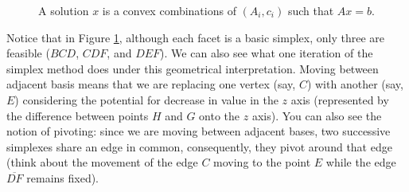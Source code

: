 \begin{figure}[h]
	\caption{A solution $x$ is a convex combinations of $(A_i,c_i)$ such that $Ax= b$.} \label{p1c4:fig:column_geometry_3d}
\end{figure}	

Notice that in Figure \ref{p1c4:fig:column_geometry_3d}, although each facet is a basic simplex, only three are feasible ($BCD$, $CDF$, and $DEF$). We can also see what one iteration of the simplex method does under this geometrical interpretation. Moving between adjacent basis means that we are replacing one vertex (say, $C$) with another (say, $E$) considering the potential for decrease in value in the $z$ axis (represented by the difference between points $H$ and $G$ onto the $z$ axis). You can also see the notion of pivoting: since we are moving between adjacent bases, two successive simplexes share an edge in common, consequently, they pivot around that edge (think about the movement of the edge $C$ moving to the point $E$ while the edge $\overline{DF}$ remains fixed).

